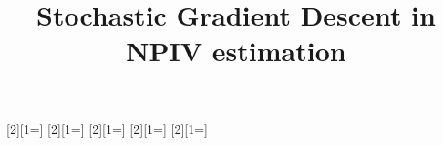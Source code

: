 

\usepackage[nonatbib]{neurips_2023}
\usepackage{global-macros}







\usepackage[T1]{fontenc}    %
\newcommand{\theHalgorithm}{\arabic{algorithm}}
\usepackage[algoruled,boxed,lined]{algorithm2e}
\usepackage{hyperref}       %
\usepackage{url}            %
\usepackage{booktabs}       %
\usepackage{amsfonts}       %
\usepackage{nicefrac}       %
\usepackage{microtype}      %
\usepackage{enumitem}
\usepackage{bbm}
\usepackage[dvipsnames]{xcolor}         %
\usepackage{biblatex}


\usepackage{xargs}                      %

\usepackage[colorinlistoftodos,prependcaption,textsize=tiny]{todonotes}
[2][1=]{}
[2][1=]{}
[2][1=]{}
[2][1=]{}
[2][1=]{}


\title{Stochastic Gradient Descent in NPIV estimation}


%


